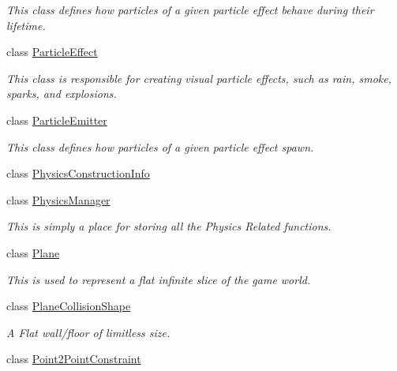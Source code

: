 \begin{DoxyCompactItemize}
\begin{DoxyCompactList}\small\item\em This class defines how particles of a given particle effect behave during their lifetime. \item\end{DoxyCompactList}\item 
class \hyperlink{classMezzanine_1_1ParticleEffect}{ParticleEffect}
\begin{DoxyCompactList}\small\item\em This class is responsible for creating visual particle effects, such as rain, smoke, sparks, and explosions. \item\end{DoxyCompactList}\item 
class \hyperlink{classMezzanine_1_1ParticleEmitter}{ParticleEmitter}
\begin{DoxyCompactList}\small\item\em This class defines how particles of a given particle effect spawn. \item\end{DoxyCompactList}\item 
class \hyperlink{classMezzanine_1_1PhysicsConstructionInfo}{PhysicsConstructionInfo}
\item 
class \hyperlink{classMezzanine_1_1PhysicsManager}{PhysicsManager}
\begin{DoxyCompactList}\small\item\em This is simply a place for storing all the Physics Related functions. \item\end{DoxyCompactList}\item 
class \hyperlink{classMezzanine_1_1Plane}{Plane}
\begin{DoxyCompactList}\small\item\em This is used to represent a flat infinite slice of the game world. \item\end{DoxyCompactList}\item 
class \hyperlink{classMezzanine_1_1PlaneCollisionShape}{PlaneCollisionShape}
\begin{DoxyCompactList}\small\item\em A Flat wall/floor of limitless size. \item\end{DoxyCompactList}\item 
class \hyperlink{classMezzanine_1_1Point2PointConstraint}{Point2PointConstraint}

\end{DoxyCompactItemize}
